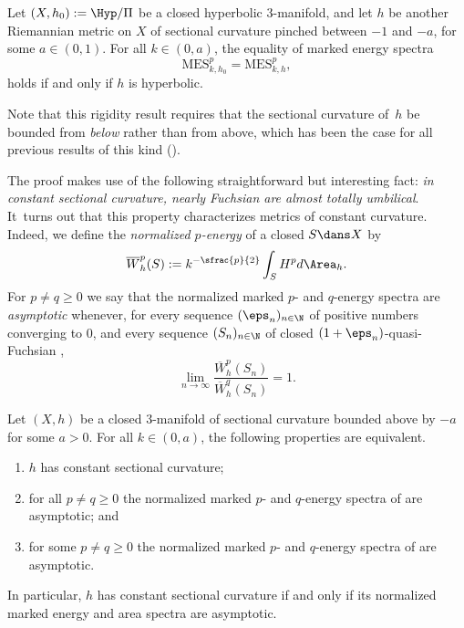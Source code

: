 \begin{theorem}\label{thm.Rigidity_hyp_energy_spectrum}
Let $(X,h_0):=\Hyp/\Pi$ be a closed hyperbolic $3$\nobreakdash-manifold, and let $h$ be another Riemannian metric on $X$ of sectional curvature pinched between $-1$ and $-a$, for some $a\in(0,1)$. For all $k\in(0,a)$, the equality of marked energy spectra
\begin{equation}\label{eqn.rigidity_energy}
\mathrm{MES}^p_{k,h_0}=\mathrm{MES}^p_{k,h},
\end{equation}
holds if and only if $h$ is hyperbolic.
\end{theorem}

\begin{remark}
Note that this rigidity result requires that the sectional curvature of~$h$ be bounded from \emph{below} rather than from above, which has been the case for all previous results of this kind (\cf \cite{ALS,CMN}).
\end{remark}

The proof makes use of the following straightforward but interesting fact: \emph{in constant sectional curvature, nearly Fuchsian \ksurfaces are almost totally umbilical}. It~turns out that this property characterizes metrics of constant curvature. Indeed, we define the \emph{normalized $p$-energy} of a closed \ksurface $S\dans X$ by
\begin{equation*}
\overline{W}^{p}_h(S) := k^{-\sfrac{p}{2}}\int_S H^p d\Area_h.
\end{equation*}
For $p\neq q\geq 0$ we say that the normalized marked \ksurface $p$- and $q$-energy spectra are \emph{asymptotic} whenever, for every sequence $(\eps_n)_{n\in\N}$ of positive numbers converging to $0$, and every sequence $(S_n)_{n\in\N}$ of closed $(1+\eps_n)$-quasi-Fuchsian \ksurfaces,
\begin{equation*}
\lim_{n\to\infty}\frac{\overline{W}^{p}_h(S_n)}{\overline{W}^{q}_h(S_n)}=1.
\end{equation*}

\begin{theorem}\label{thm.asymptotic_spectra}
Let $(X,h)$ be a closed $3$\nobreakdash-manifold of sectional curvature bounded above by $-a$ for some $a>0$. For all $k\in(0,a)$, the following properties are equivalent.
\begin{enumerate}
\item $h$ has constant sectional curvature;
\item for all $p\neq q\geq 0$ the normalized marked \ksurface $p$- and $q$-energy spectra of \ksurfaces are asymptotic; and
\item for some $p\neq q\geq 0$ the normalized marked \ksurface $p$- and $q$-energy spectra of \ksurfaces are asymptotic.
\end{enumerate}
\noindent In particular, $h$ has constant sectional curvature if and only if its normalized marked \ksurface energy and area spectra are asymptotic.
\end{theorem}

